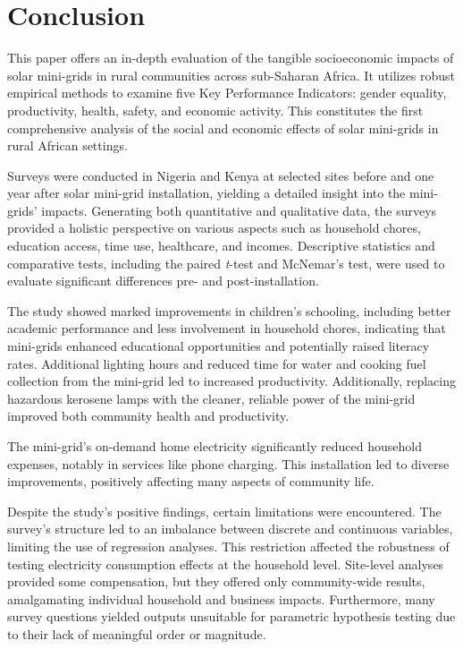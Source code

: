 \section{Conclusion}
\label{sec:conclusion}
This paper offers an in-depth evaluation of the tangible socioeconomic impacts of solar mini-grids in rural communities across sub-Saharan Africa. It utilizes robust empirical methods to examine five Key Performance Indicators: gender equality, productivity, health, safety, and economic activity. This constitutes the first comprehensive analysis of the social and economic effects of solar mini-grids in rural African settings.

Surveys were conducted in Nigeria and Kenya at selected sites before and one year after solar mini-grid installation, yielding a detailed insight into the mini-grids' impacts. Generating both quantitative and qualitative data, the surveys provided a holistic perspective on various aspects such as household chores, education access, time use, healthcare, and incomes. Descriptive statistics and comparative tests, including the paired \textit{t}-test and McNemar's test, were used to evaluate significant differences pre- and post-installation.

The study showed marked improvements in children's schooling, including better academic performance and less involvement in household chores, indicating that mini-grids enhanced educational opportunities and potentially raised literacy rates. Additional lighting hours and reduced time for water and cooking fuel collection from the mini-grid led to increased productivity. Additionally, replacing hazardous kerosene lamps with the cleaner, reliable power of the mini-grid improved both community health and productivity.

The mini-grid's on-demand home electricity significantly reduced household expenses, notably in services like phone charging. This installation led to diverse improvements, positively affecting many aspects of community life.

Despite the study's positive findings, certain limitations were encountered. The survey's structure led to an imbalance between discrete and continuous variables, limiting the use of regression analyses. This restriction affected the robustness of testing electricity consumption effects at the household level. Site-level analyses provided some compensation, but they offered only community-wide results, amalgamating individual household and business impacts. Furthermore, many survey questions yielded outputs unsuitable for parametric hypothesis testing due to their lack of meaningful order or magnitude.

